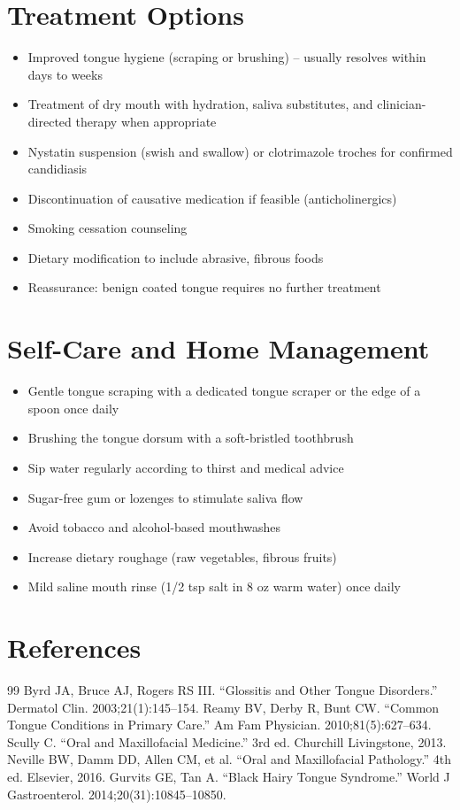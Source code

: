 \section*{Treatment Options}
\begin{itemize}
  \item Improved tongue hygiene (scraping or brushing) -- usually resolves within days to weeks
  \item Treatment of dry mouth with hydration, saliva substitutes, and clinician-directed therapy when appropriate
  \item Nystatin suspension (swish and swallow) or clotrimazole troches for confirmed candidiasis
  \item Discontinuation of causative medication if feasible (anticholinergics)
  \item Smoking cessation counseling
  \item Dietary modification to include abrasive, fibrous foods
  \item Reassurance: benign coated tongue requires no further treatment
\end{itemize}

\section*{Self-Care and Home Management}
\begin{itemize}
  \item Gentle tongue scraping with a dedicated tongue scraper or the edge of a spoon once daily
  \item Brushing the tongue dorsum with a soft-bristled toothbrush
  \item Sip water regularly according to thirst and medical advice
  \item Sugar-free gum or lozenges to stimulate saliva flow
  \item Avoid tobacco and alcohol-based mouthwashes
  \item Increase dietary roughage (raw vegetables, fibrous fruits)
  \item Mild saline mouth rinse (1/2 tsp salt in 8 oz warm water) once daily
\end{itemize}

\section*{References}
\begin{thebibliography}{99}
 Byrd JA, Bruce AJ, Rogers RS III. ``Glossitis and Other Tongue Disorders.'' Dermatol Clin. 2003;21(1):145--154.
 Reamy BV, Derby R, Bunt CW. ``Common Tongue Conditions in Primary Care.'' Am Fam Physician. 2010;81(5):627--634.
 Scully C. ``Oral and Maxillofacial Medicine.'' 3rd ed. Churchill Livingstone, 2013.
 Neville BW, Damm DD, Allen CM, et al. ``Oral and Maxillofacial Pathology.'' 4th ed. Elsevier, 2016.
 Gurvits GE, Tan A. ``Black Hairy Tongue Syndrome.'' World J Gastroenterol. 2014;20(31):10845--10850.
\end{thebibliography}
